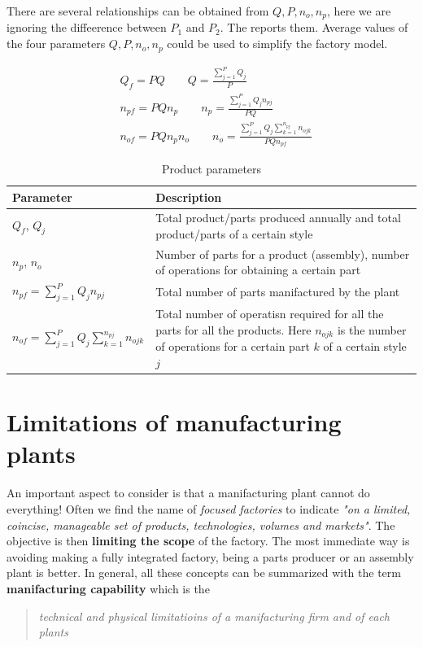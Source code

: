 There are several relationships can be obtained from $Q,P,n_o,n_p$, here we are ignoring the diffeerence between $P_1$ and $P_2$. The  reports them. Average values of the four parameters $Q, P, n_o, n_p$ could be used to simplify the factory model.

\begin{align}
    &Q_f=PQ\qquad Q=\frac{\sum_{j=1}^P {Q_j}}{P}\\
    &n_{pf}=PQn_p \qquad{n_p}=\frac{\sum_{j=1}^{P}{Q_j{n_{pj}}}}{PQ}\\
    &n_{of}=PQn_p{n_o}\qquad n_o=\frac{
        \sum_{j=1}^{P}Q_j\sum_{k=1}^{n_{pj}}{n_{ojk}}
    }{PQn_{pf}}
\end{align}


\begin{table}
    \centering
    \begin{tabular}{p{5cm} p{10cm}}
        \toprule
        \textbf{Parameter}&\textbf{Description}\\
        \toprule\toprule
        {$Q_f$, $Q_j$}&{Total product/parts produced annually and total product/parts of a certain style}\\
        \midrule
        {$n_p$, $n_o$}&{Number of parts for a product (assembly), number of operations for obtaining a certain part}\\
        \midrule
        $n_{pf}=\sum_{j=1}^{P}{Q_j{n_{pj}}}$&{Total number of parts manifactured by the plant}\\
        \midrule
        {$n_{of}=\sum_{j=1}^{P}Q_j\sum_{k=1}^{n_{pj}}{n_{ojk}}$}&{Total  number of operatisn required for all the parts for all the products. Here $n_{ojk}$ is the number of operations for a certain part $k$ of a certain style $j$}\\ 
        \bottomrule
        \bottomrule
     \end{tabular}
     \caption{Product parameters}
     \label{tab:prod_param}
\end{table}

\section{Limitations of manufacturing plants}
An important aspect to consider is that a manifacturing plant cannot do everything! Often we find the name of \textit{focused factories} to indicate \textit{"on a limited, coincise, manageable set of products, technologies, volumes and markets"}. The objective is then \textbf{limiting the scope} of the factory. The most immediate way is avoiding making a fully integrated factory, being a parts producer or an assembly plant is better. In general, all these concepts can be summarized with the term \textbf{manifacturing capability} which is the  
\begin{quotation}
    \textit{technical and physical limitatioins of a manifacturing firm and of each plants}
\end{quotation}

